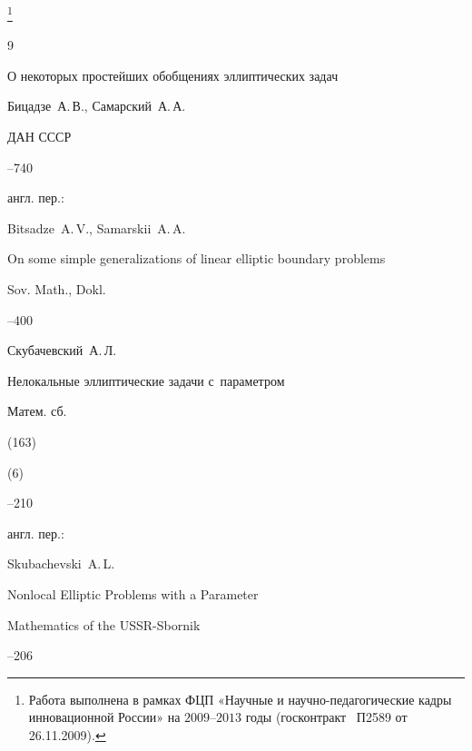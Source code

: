 




\thanks{Работа выполнена в рамках ФЦП «Научные и научно-педагогические кадры инновационной России» на $2009$--$2013$ годы {\rm (}госконтракт {\rm\No~П2589} от {\rm 26.11.2009\rm).}}







\begin{thebibliography}{9}




\paper О некоторых простейших обобщениях эллиптических задач 

\by Бицадзе~А.\,В., Самарский~А.\,А. 

\jour ДАН СССР




--740

 \transl англ. пер.:

 \by Bitsadze~A.\,V., Samarskii~A.\,A.

\paper On some simple generalizations of linear elliptic boundary problems

\jour Sov. Math., Dokl.


--400


 


\by Скубачевский~А.\,Л.

\paper Нелокальные эллиптические задачи с~параметром

\jour Матем. сб.


(163)

(6)

--210

\transl англ. пер.:

\by Skubachevski\capitalbreve{\i}~A.\,L.

\paper Nonlocal Elliptic Problems with a Parameter

\jour Mathematics of the USSR-Sbornik




--206




\end{thebibliography}
